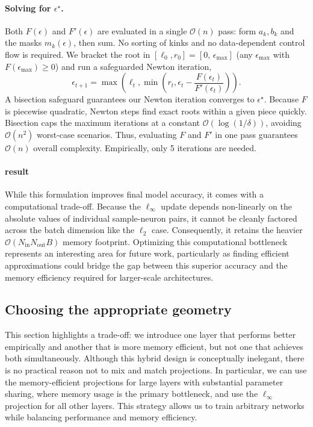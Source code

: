 \paragraph{Solving for $\epsilon^\star$.}
Both $F(\epsilon)$ and $F'(\epsilon)$ are evaluated in a single $\mathcal{O}(n)$ pass:
form $a_k,b_k$ and the masks $m_k(\epsilon)$, then sum. No sorting of kinks and no
data-dependent control flow is required. We bracket the root in $[\ell_0, r_0] = [0,\,\epsilon_{\max}]$
(any $\epsilon_{\max}$ with $F(\epsilon_{\max})\ge 0$) and run a safeguarded Newton iteration,
\[
  \epsilon_{t+1}
    = \max\!\left(\ell_t,\min\!\left(r_t,
      \epsilon_t - \frac{F(\epsilon_t)}{F'(\epsilon_t)}\right)\right).
\]
A bisection safeguard guarantees our Newton iteration converges to $\epsilon^\star$. Because $F$ is piecewise quadratic, Newton steps find exact roots within a given piece quickly. Bisection caps the maximum iterations at a constant $\mathcal{O}(\log(1/\delta))$, avoiding $\mathcal{O}(n^2)$ worst-case scenarios. Thus, evaluating $F$ and $F'$ in one pass guarantees $\mathcal{O}(n)$ overall complexity. Empirically, only 5 iterations are needed. 

\paragraph{result}
While this formulation improves final model accuracy, it comes with a computational trade-off. Because the $\ell_\infty$ update depends non-linearly on the absolute values of individual sample-neuron pairs, it cannot be cleanly factored across the batch dimension like the $\ell_2$ case. Consequently, it retains the heavier $\mathcal{O}(N_{\mathrm{in}}N_{\mathrm{out}}B)$ memory footprint. Optimizing this computational bottleneck represents an interesting area for future work, particularly as finding efficient approximations could bridge the gap between this superior accuracy and the memory efficiency required for larger-scale architectures.

\subsection{Choosing the appropriate geometry}
This section highlights a trade-off: we introduce one layer that performs better empirically and another that is more memory efficient, but not one that achieves both simultaneously. Although this hybrid design is conceptually inelegant, there is no practical reason not to mix and match projections. In particular, we can use the memory-efficient projections for large layers with substantial parameter sharing, where memory usage is the primary bottleneck, and use the $\ell_\infty$ projection for all other layers. This strategy allows us to train arbitrary networks while balancing performance and memory efficiency.

